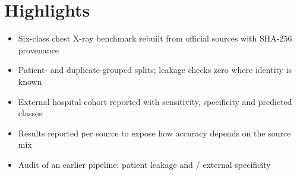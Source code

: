 \documentclass[12pt]{article}
\begin{document}
\section*{Highlights}
\begin{itemize}
\item Six-class chest X-ray benchmark rebuilt from official sources with SHA-256 provenance %
\item Patient- and duplicate-grouped splits; leakage checks zero where identity is known %
\item External hospital cohort reported with sensitivity, specificity and predicted classes %
\item Results reported per source to expose how accuracy depends on the source mix %
\item Audit of an earlier pipeline: patient leakage and \RVFiveExtSpecK/\RVFiveExtSpecN{} external specificity %
\end{itemize}
\end{document}
